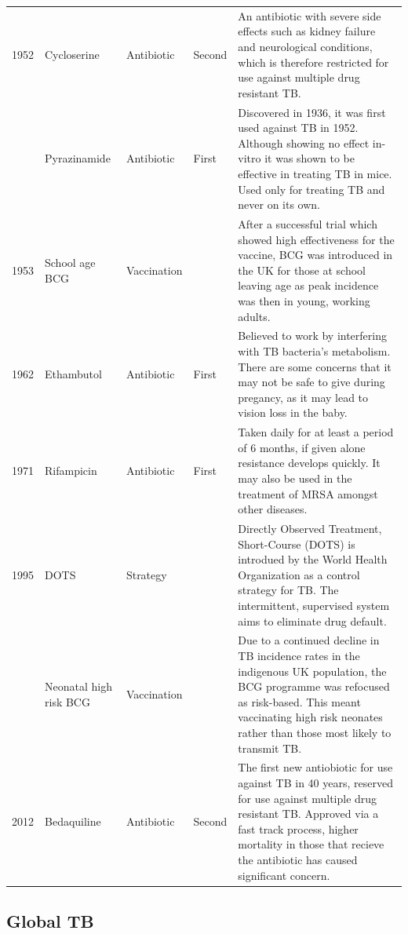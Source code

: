 \documentclass[11pt,twoside]{bristolthesis}
\begin{document}
\begin{landscape}
\begin{longtable}{rlll>{\raggedright\arraybackslash}p{10cm}}
  1952 & Cycloserine & Antibiotic & Second & An antibiotic with severe side effects such as kidney failure and neurological conditions, which is therefore restricted for use against multiple
                                               drug resistant TB.\\
  \addlinespace
  1952 & Pyrazinamide & Antibiotic & First & Discovered in 1936, it was first used against TB in 1952. Although showing no effect in-vitro it was shown to be effective in treating TB in mice.
                                               Used only for treating TB and never on its own.\\
  1953 & School age BCG & Vaccination &  & After a successful trial which showed high effectiveness
                                               for the vaccine, BCG was introduced in the UK for those at school leaving age
                                               as peak incidence was then in young, working adults.\\
  1962 & Ethambutol & Antibiotic & First & Believed to work by interfering with TB bacteria's metabolism. There are some concerns that it may not be safe to give during pregancy,
                                               as it may lead to vision loss in the baby.\\
  1971 & Rifampicin & Antibiotic & First & Taken daily for at least a period of 6 months, if given alone resistance develops quickly. It may also be used in the treatment
                                               of MRSA amongst other diseases.\\
  1995 & DOTS & Strategy &  & Directly Observed Treatment, Short-Course (DOTS) is introdued by the World Health Organization as a control strategy for TB. The intermittent, supervised system
                                               aims to eliminate drug default.\\
  \addlinespace
  2005 & Neonatal high risk BCG & Vaccination &  & Due to a continued decline in TB incidence rates in the indigenous UK population, the BCG 
                                               programme was refocused as risk-based. This meant vaccinating high risk neonates rather than those 
                                               most likely to transmit TB.\\
  2012 & Bedaquiline & Antibiotic & Second & The first new antiobiotic for use against TB in 40 years, reserved for use against multiple drug resistant TB. Approved via a fast track process, higher mortality in those that recieve the antibiotic has caused
                                               significant concern.\\*
  \end{longtable}
  \endgroup{}
  \end{landscape}
  \hypertarget{global-tb}{%
  \subsection{Global TB}\label{global-tb}}
  
\end{document}
